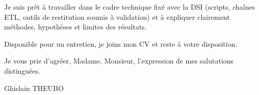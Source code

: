 \documentclass[11pt,a4paper]{article}
\begin{document}
\noindent Je suis pr\^et \`a travailler dans le cadre technique fix\'e avec la DSI (scripts, cha\^ines ETL, outils de restitution soumis \`a validation) et \`a expliquer clairement m\'ethodes, hypoth\`eses et limites des r\'esultats.

\vspace{0.5em}
\noindent Disponible pour un entretien, je joins mon CV et reste \`a votre disposition.

\vspace{0.8em}
\noindent Je vous prie d'agr\'eer, Madame, Monsieur, l'expression de mes salutations distingu\'ees.

\vspace{1.5em}
\noindent Ghislain THEUBO
\end{document}
